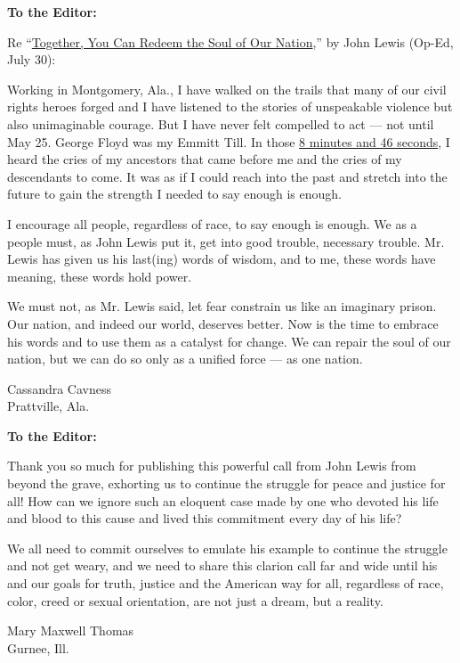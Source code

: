 \textbf{To the Editor:}

Re
``\href{https://www.nytimes3xbfgragh.onion/2020/07/30/opinion/john-lewis-civil-rights-america.html}{Together,
You Can Redeem the Soul of Our Nation},'' by John Lewis (Op-Ed, July
30):

Working in Montgomery, Ala., I have walked on the trails that many of
our civil rights heroes forged and I have listened to the stories of
unspeakable violence but also unimaginable courage. But I have never
felt compelled to act --- not until May 25. George Floyd was my Emmitt
Till. In those
\href{https://www.nytimes3xbfgragh.onion/2020/06/18/us/george-floyd-timing.html}{8
minutes and 46 seconds}, I heard the cries of my ancestors that came
before me and the cries of my descendants to come. It was as if I could
reach into the past and stretch into the future to gain the strength I
needed to say enough is enough.

I encourage all people, regardless of race, to say enough is enough. We
as a people must, as John Lewis put it, get into good trouble, necessary
trouble. Mr. Lewis has given us his last(ing) words of wisdom, and to
me, these words have meaning, these words hold power.

We must not, as Mr. Lewis said, let fear constrain us like an imaginary
prison. Our nation, and indeed our world, deserves better. Now is the
time to embrace his words and to use them as a catalyst for change. We
can repair the soul of our nation, but we can do so only as a unified
force --- as one nation.

Cassandra Cavness\\
Prattville, Ala.

\textbf{To the Editor:}

Thank you so much for publishing this powerful call from John Lewis from
beyond the grave, exhorting us to continue the struggle for peace and
justice for all! How can we ignore such an eloquent case made by one who
devoted his life and blood to this cause and lived this commitment every
day of his life?

We all need to commit ourselves to emulate his example to continue the
struggle and not get weary, and we need to share this clarion call far
and wide until his and our goals for truth, justice and the American way
for all, regardless of race, color, creed or sexual orientation, are not
just a dream, but a reality.

Mary Maxwell Thomas\\
Gurnee, Ill.

